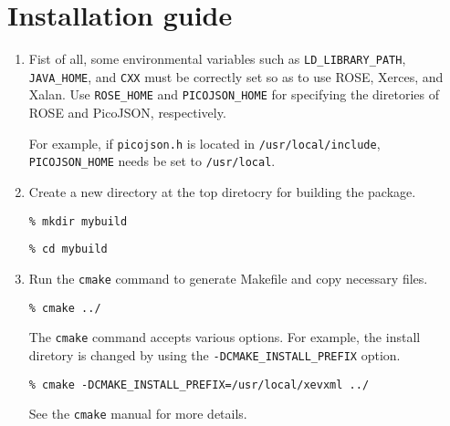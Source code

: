\section{Installation guide}
\begin{enumerate}
 \item Fist of all, some environmental variables such as
       \texttt{LD\_LIBRARY\_PATH}, \texttt{JAVA\_HOME}, and \texttt{CXX}
       must be correctly set so as to use ROSE, Xerces, and Xalan. Use
       \texttt{ROSE\_HOME} and \texttt{PICOJSON\_HOME} for specifying
       the diretories of ROSE and PicoJSON, respectively.

       For example, if \texttt{picojson.h} is located in
       \texttt{/usr/local/include}, \texttt{PICOJSON\_HOME} needs be set
       to \texttt{/usr/local}.

 \item Create a new directory at the top diretocry for building the package.
       
       \texttt{\% mkdir mybuild}

       \texttt{\% cd mybuild}

 \item Run the \texttt{cmake} command to generate Makefile and copy necessary files.

       \texttt{\% cmake ../}

       The \texttt{cmake} command accepts various options. For example,
       the install diretory is changed by using the
       \texttt{-DCMAKE\_INSTALL\_PREFIX} option.

       \texttt{\% cmake -DCMAKE\_INSTALL\_PREFIX=/usr/local/xevxml ../}

       See the \texttt{cmake} manual for more details\cite{cmake}.



       


\end{enumerate}
